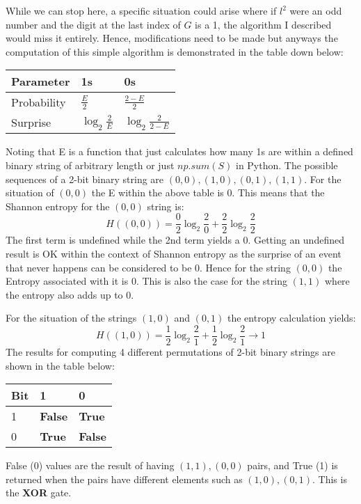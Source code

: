 \vspace{0.3cm}
While we can stop here, a specific situation could arise where if $l^{2}$ were an odd number and the digit at the last index of $G$ is a 1, the algorithm I described would miss it entirely. Hence, modifications need to be made but anyways the computation of this simple algorithm is demonstrated in the table down below: 
\begin{center}
\begin{tabular}{ |p{3cm}||p{3cm}||p{3cm}|  }
\hline
Parameter& 1s & 0s \\
 \hline
 Probability  & $\frac{E}{2}$ & $\frac{2-E}{2}$\\  
 Surprise &   $\log_{2}\frac{2}{E}$ & $\log_{2}\frac{2}{2-E}$ \\[1.5ex] 
  \hline
\end{tabular}
\end{center}
Noting that E is a function that just calculates how many 1s are within a defined binary string of arbitrary length or just $np.sum(S)$ in Python. The possible sequences of a 2-bit binary string are $(0,0), (1,0), (0,1), (1,1)$. For the situation of $(0,0)$ the E within the above table is 0. This means that the Shannon entropy for the $(0,0)$ string is: 
$$H((0,0))=\frac{0}{2}\log_{2}\frac{2}{0}+\frac{2}{2}\log_{2}\frac{2}{2}$$
The first term is undefined while the 2nd term yields a 0. Getting an undefined result is OK within the context of Shannon entropy as the surprise of an event that never happens can be considered to be 0. Hence for the string $(0,0)$ the Entropy associated with it is 0. This is also the case for the string $(1,1)$ where the entropy also adds up to 0. \par

\vspace{0.3cm}
For the situation of the strings $(1,0)$ and $(0,1)$ the entropy calculation yields:
$$H((1,0))=\frac{1}{2}\log_{2}\frac{2}{1}+\frac{1}{2}\log_{2}\frac{2}{1}\longrightarrow 1$$
The results for computing 4 different permutations of 2-bit binary strings are shown in the table below: 
\begin{center}
\begin{tabular}{ |p{3cm}||p{3cm}||p{3cm}|  }
\hline
Bit& 1 & 0 \\
 \hline
 1  & \textbf{False} & \textbf{True}\\  
 0 &  \textbf{True} & \textbf{False}\\
  \hline
\end{tabular}
\end{center}
 False (0) values are the result of having $(1,1), (0,0)$ pairs, and True (1) is returned when the pairs have different elements such as $(1,0), (0,1)$. This is the \textbf{XOR} gate. \par
\vspace{0,5cm}

